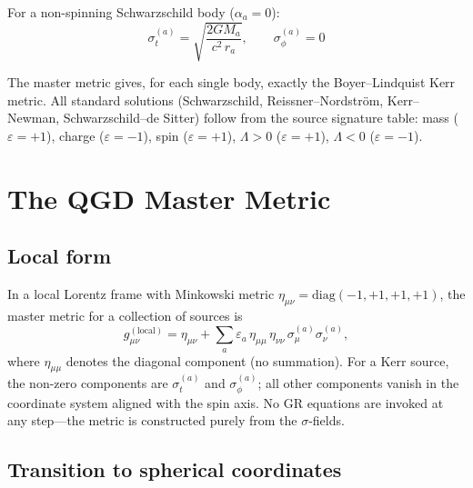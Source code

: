 \documentclass[11pt,a4paper]{article}
\theoremstyle{plain}
\theoremstyle{definition}
\theoremstyle{remark}
\newcommand{\sig}[2]{\sigma_{#1}^{(#2)}}
\begin{document}
For a non-spinning Schwarzschild body ($\alpha_a = 0$):
\begin{equation}
  \sig{t}{a} = \sqrt{\frac{2GM_a}{c^2\,r_a}}, \qquad \sig{\phi}{a} = 0
  \label{eq:sigma_schw}
\end{equation}

The master metric gives, for each single body, exactly the Boyer--Lindquist Kerr metric.  All standard solutions (Schwarzschild, Reissner--Nordstr\"om, Kerr--Newman, Schwarzschild--de Sitter) follow from the source signature table: mass ($\varepsilon = +1$), charge ($\varepsilon = -1$), spin ($\varepsilon = +1$), $\Lambda > 0$ ($\varepsilon = +1$), $\Lambda < 0$ ($\varepsilon = -1$).

\section{The QGD Master Metric}
\label{sec:master_metric}

\subsection{Local form}

In a local Lorentz frame with Minkowski metric $\eta_{\mu\nu} = \mathrm{diag}(-1,+1,+1,+1)$, the master metric for a collection of sources is
\begin{equation}
  g_{\mu\nu}^{(\mathrm{local})} = \eta_{\mu\nu} + \sum_a \varepsilon_a\, \eta_{\mu\mu}\,\eta_{\nu\nu}\,\sig{\mu}{a}\sig{\nu}{a},
  \label{eq:master_local}
\end{equation}
where $\eta_{\mu\mu}$ denotes the diagonal component (no summation). For a Kerr source, the non-zero components are $\sig{t}{a}$ and $\sig{\phi}{a}$; all other components vanish in the coordinate system aligned with the spin axis. No GR equations are invoked at any step---the metric is constructed purely from the $\sigma$-fields.

\subsection{Transition to spherical coordinates}
\end{document}
